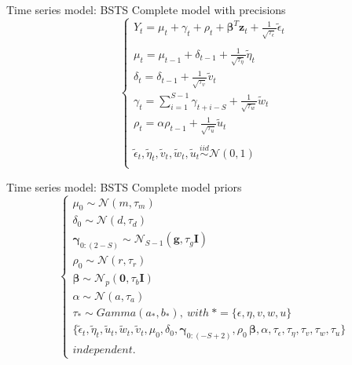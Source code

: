 \documentclass{beamer}
\begin{document}
\begin{frame}{Time series model: BSTS}
\alert{Complete model} with precisions
\begin{equation}
\begin{cases}
Y_t = \mu_t + \gamma_t + \rho_t + \boldsymbol{\beta}^T\mathbf{z}_t + \frac{1}{\sqrt{\tau_\epsilon}}\tilde{\epsilon}_t\\
\\
\mu_t = \mu_{t-1} + \delta_{t-1} +\frac{1}{\sqrt{\tau_\eta}}\tilde{\eta}_t\\
\delta_t = \delta_{t-1} + \frac{1}{\sqrt{\tau_v}}\tilde{v}_t\\
\gamma_t = \sum_{i=1}^{S-1}\gamma_{t+i-S} + \frac{1}{\sqrt{\tau_w}}\tilde{w}_t\\
\rho_t = \alpha\rho_{t-1} + \frac{1}{\sqrt{\tau_u}}\tilde{u}_t\\
\\
\tilde{\epsilon}_t, \tilde{\eta}_t, \tilde{v}_t, \tilde{w}_t, \tilde{u}_t \overset{iid}{\sim} \mathcal{N}(0,1)\\
\end{cases}
\end{equation}
\end{frame}

\begin{frame}{Time series model: BSTS}
Complete model priors
\begin{equation}
\begin{cases}
\mu_0 \sim \mathcal{N}(m, \tau_m)\\
\delta_0 \sim \mathcal{N}(d, \tau_d)\\
\boldsymbol{\gamma}_{0:(2-S)} \sim \mathcal{N}_{S-1}(\mathbf{g}, \tau_g\mathbf{I})\\
\rho_0 \sim \mathcal{N}(r, \tau_r)\\
\boldsymbol{\beta} \sim \mathcal{N}_p(\mathbf{0}, \tau_b \mathbf{I})\\
\alpha \sim \mathcal{N}(a, \tau_a)\\
\tau_* \sim Gamma(a_*, b_*),\ with\ *=\{\epsilon, \eta, v,w,u\}\\
\{\tilde{\epsilon}_t, \tilde{\eta}_t, \tilde{u}_t, \tilde{w}_t, \tilde{v}_t, \mu_0, \delta_0, \boldsymbol{\gamma}_{0:(-S+2)}, \rho_0\, \boldsymbol{\beta}, \alpha, \tau_\epsilon, \tau_\eta, \tau_v, \tau_w, \tau_u\}\\ independent .
\end{cases}
\end{equation}
\end{frame}
\end{document}
